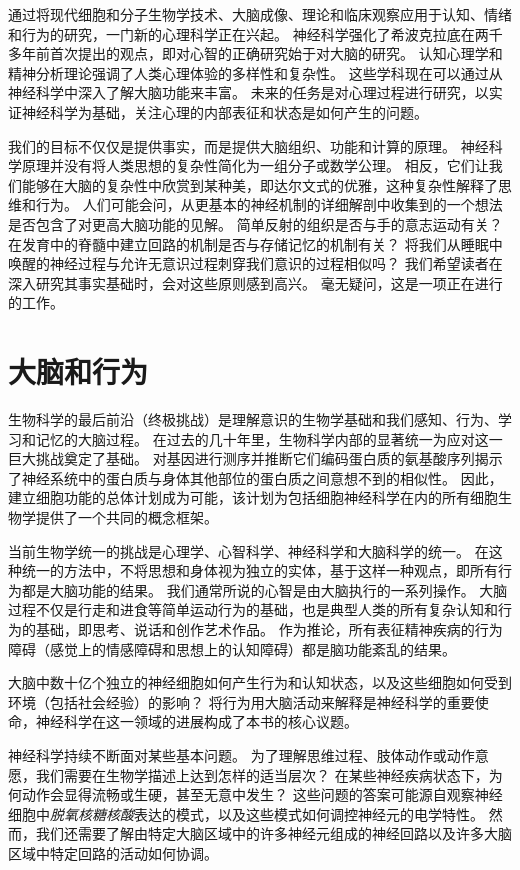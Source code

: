 通过将现代细胞和分子生物学技术、大脑成像、理论和临床观察应用于认知、情绪和行为的研究，一门新的心理科学正在兴起。
神经科学强化了希波克拉底在两千多年前首次提出的观点，即对心智的正确研究始于对大脑的研究。
认知心理学和精神分析理论强调了人类心理体验的多样性和复杂性。
这些学科现在可以通过从神经科学中深入了解大脑功能来丰富。
未来的任务是对心理过程进行研究，以实证神经科学为基础，关注心理的内部表征和状态是如何产生的问题。


我们的目标不仅仅是提供事实，而是提供大脑组织、功能和计算的原理。
神经科学原理并没有将人类思想的复杂性简化为一组分子或数学公理。
相反，它们让我们能够在大脑的复杂性中欣赏到某种美，即达尔文式的优雅，这种复杂性解释了思维和行为。
人们可能会问，从更基本的神经机制的详细解剖中收集到的一个想法是否包含了对更高大脑功能的见解。
简单反射的组织是否与手的意志运动有关？
在发育中的脊髓中建立回路的机制是否与存储记忆的机制有关？
将我们从睡眠中唤醒的神经过程与允许无意识过程刺穿我们意识的过程相似吗？
我们希望读者在深入研究其事实基础时，会对这些原则感到高兴。
毫无疑问，这是一项正在进行的工作。





\chapter{大脑和行为} \label{chap:chap1}
生物科学的最后前沿（终极挑战）是理解意识的生物学基础和我们感知、行为、学习和记忆的大脑过程。 
在过去的几十年里，生物科学内部的显著统一为应对这一巨大挑战奠定了基础。 
对基因进行测序并推断它们编码蛋白质的氨基酸序列揭示了神经系统中的蛋白质与身体其他部位的蛋白质之间意想不到的相似性。 
因此，建立细胞功能的总体计划成为可能，该计划为包括细胞神经科学在内的所有细胞生物学提供了一个共同的概念框架。


当前生物学统一的挑战是心理学、心智科学、神经科学和大脑科学的统一。 
在这种统一的方法中，不将思想和身体视为独立的实体，基于这样一种观点，即所有行为都是大脑功能的结果。 
我们通常所说的心智是由大脑执行的一系列操作。 
大脑过程不仅是行走和进食等简单运动行为的基础，也是典型人类的所有复杂认知和行为的基础，即思考、说话和创作艺术作品。 
作为推论，所有表征精神疾病的行为障碍（感觉上的情感障碍和思想上的认知障碍）都是脑功能紊乱的结果。


大脑中数十亿个独立的神经细胞如何产生行为和认知状态，以及这些细胞如何受到环境（包括社会经验）的影响？ 
将行为用大脑活动来解释是神经科学的重要使命，神经科学在这一领域的进展构成了本书的核心议题。


神经科学持续不断面对某些基本问题。 
为了理解思维过程、肢体动作或动作意愿，我们需要在生物学描述上达到怎样的适当层次？ 
在某些神经疾病状态下，为何动作会显得流畅或生硬，甚至无意中发生？ 
这些问题的答案可能源自观察神经细胞中\textit{脱氧核糖核酸}表达的模式，以及这些模式如何调控神经元的电学特性。
然而，我们还需要了解由特定大脑区域中的许多神经元组成的神经回路以及许多大脑区域中特定回路的活动如何协调。


